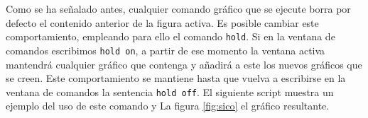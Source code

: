 


















Como se ha señalado antes, cualquier comando gráfico que se ejecute borra por defecto el contenido anterior de la figura activa. Es posible cambiar este comportamiento, empleando para ello el comando \texttt{hold}. Si en la ventana de comandos escribimos \texttt{hold on}, a partir de ese momento la ventana activa mantendrá cualquier gráfico que contenga y añadirá a este los nuevos gráficos que se creen. Este comportamiento se mantiene hasta que vuelva a escribirse en la ventana de comandos la sentencia \texttt{hold off}. El siguiente script muestra un ejemplo del uso de este comando y La figura \ref{fig:sico} el gráfico resultante.

